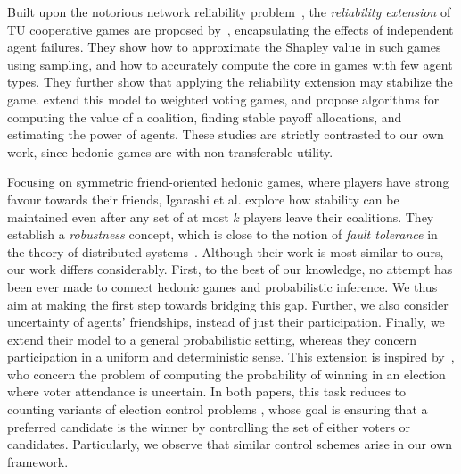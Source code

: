 \documentclass[letterpaper]{article}
\begin{document}
Built upon the notorious network reliability problem~\cite{provan1983complexity}, the \textit{reliability extension} of TU cooperative games are proposed by~\cite{bachrach2011solving,bachrach2012agent}, encapsulating the effects of independent agent failures. They show how to approximate the Shapley value in such games using sampling, and how to accurately compute the core in games with few agent types. They further show that applying the reliability extension may stabilize the game. \cite{bachrach2013reliability} extend this model to weighted voting games, and propose algorithms for computing the value of a coalition, finding stable payoff allocations, and estimating the power of agents. These studies are strictly contrasted to our own work, since hedonic games are with non-transferable utility.

Focusing on symmetric friend-oriented hedonic games, where players have strong favour towards their friends, Igarashi et al.  explore how stability can be maintained even after any set of at most $k$ players leave their coalitions. They establish a \textit{robustness} concept, which is close to the notion of \textit{fault tolerance} in the theory of distributed systems~\cite{fedoruk2002improving}. Although their work is most similar to ours, our work differs considerably. First, to the best of our knowledge, no attempt has been ever made to connect hedonic games and probabilistic inference. We thus aim at making the first step towards bridging this gap. Further, we also consider uncertainty of agents’ friendships, instead of just their participation. Finally, we extend their model to a general probabilistic setting, whereas they concern participation in a uniform and deterministic sense. This extension is inspired by~\cite{imber2021probabilistic,wojtas2012possible}, who concern the problem of computing the probability of winning in an election where voter attendance is uncertain. In both papers, this task reduces to counting variants of election control problems \cite{bartholdi1992hard}, whose goal is ensuring that a preferred candidate is the winner by controlling the set of either voters or candidates. Particularly, we observe that similar control schemes arise in our own framework.
\end{document}

